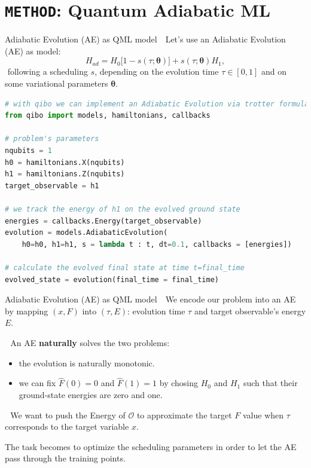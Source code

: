 \documentclass[8pt, xcolor={svgnames}, hyperref={colorlinks, linkcolor=black, citecolor=amethyst, urlcolor=amethyst}]{beamer}
\begin{document}
\section{\texttt{METHOD}: Quantum Adiabatic ML}

\begin{frame}[fragile]{Adiabatic Evolution (AE) as QML model}
\large
\faArrowCircleRight\,\, Let's use an Adiabatic Evolution (AE) as model:
\begin{equation}
    H_{ad} = H_0 \bigl[1 - s(\tau; \bm{\theta})\bigr] + s(\tau; \bm{\theta}) H_1,
    \label{eq:adiabatic_evolution}
\end{equation}
\faArrowCircleRight\,\,following a scheduling $s$, depending on the evolution time $\tau\in[0,1]$
and on some variational parameters $\bm{\theta}$.
\pause
\begin{tcolorbox}
\begin{lstlisting}[language=Python]
# with qibo we can implement an Adiabatic Evolution via trotter formula
from qibo import models, hamiltonians, callbacks

# problem's parameters
nqubits = 1
h0 = hamiltonians.X(nqubits)
h1 = hamiltonians.Z(nqubits)
target_observable = h1

# we track the energy of h1 on the evolved ground state
energies = callbacks.Energy(target_observable)
evolution = models.AdiabaticEvolution(
    h0=h0, h1=h1, s = lambda t : t, dt=0.1, callbacks = [energies])

# calculate the evolved final state at time t=final_time
evolved_state = evolution(final_time = final_time)
\end{lstlisting}
\end{tcolorbox}

\end{frame}

\begin{frame}[fragile]{Adiabatic Evolution (AE) as QML model}
\large
\faArrowCircleRight\,\, We encode our problem into an AE by mapping 
$(x, F)$ into $(\tau, E)$: evolution time $\tau$ and target observable's energy $E$.   
\pause 

\faArrowCircleRight\,\, An AE \textbf{naturally} solves the two problems:
\pause
\begin{itemize}[noitemsep]
    \item[\faLineChart] the evolution is naturally monotonic.
    \pause
    \item[\faChain] we can fix $\hat{F}(0)=0$ and $\hat{F}(1)=1$ by chosing $H_0$ and $H_1$
    such that their ground-state energies are zero and one.
\end{itemize}

\pause
\faArrowCircleRight\,\, We want to push the Energy of $\mathcal{O}$ to approximate
the target $F$ value when $\tau$ corresponds to the target variable $x$.

\pause
\vspace{0.3cm}
\begin{tcolorbox}[colback=amethyst!15, title=Optimizing the AE]
The task becomes to optimize the scheduling parameters in order to let the 
AE pass through the training points.
\end{tcolorbox}
\end{frame}
\end{document}
